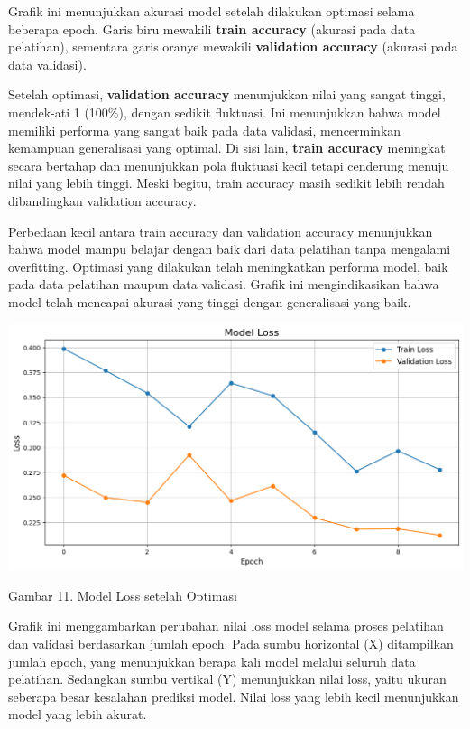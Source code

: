 \documentclass[12pt,a4paper]{article}
\begin{document}
Grafik ini menunjukkan akurasi model setelah dilakukan optimasi selama beberapa epoch. Garis biru mewakili \textbf{train accuracy} (akurasi pada data pelatihan), sementara garis oranye mewakili \textbf{validation accuracy} (akurasi pada data validasi).

Setelah optimasi, \textbf{validation accuracy} menunjukkan nilai yang sangat tinggi, mendek-ati 1 (100\%), dengan sedikit fluktuasi. Ini menunjukkan bahwa model memiliki performa yang sangat baik pada data validasi, mencerminkan kemampuan generalisasi yang optimal. Di sisi lain, \textbf{train accuracy} meningkat secara bertahap dan menunjukkan pola fluktuasi kecil tetapi cenderung menuju nilai yang lebih tinggi. Meski begitu, train accuracy masih sedikit lebih rendah dibandingkan validation accuracy.

Perbedaan kecil antara train accuracy dan validation accuracy menunjukkan bahwa model mampu belajar dengan baik dari data pelatihan tanpa mengalami overfitting. Optimasi yang dilakukan telah meningkatkan performa model, baik pada data pelatihan maupun data validasi. Grafik ini mengindikasikan bahwa model telah mencapai akurasi yang tinggi dengan generalisasi yang baik.

\begin{center}
    \includegraphics[width=1.0\textwidth]{images/11.png}
\end{center}

\begin{center}
    Gambar 11. Model Loss setelah Optimasi
\end{center}

Grafik ini menggambarkan perubahan nilai loss model selama proses pelatihan dan validasi berdasarkan jumlah epoch. Pada sumbu horizontal (X) ditampilkan jumlah epoch, yang menunjukkan berapa kali model melalui seluruh data pelatihan. Sedangkan sumbu vertikal (Y) menunjukkan nilai loss, yaitu ukuran seberapa besar kesalahan prediksi model. Nilai loss yang lebih kecil menunjukkan model yang lebih akurat.
\end{document}
